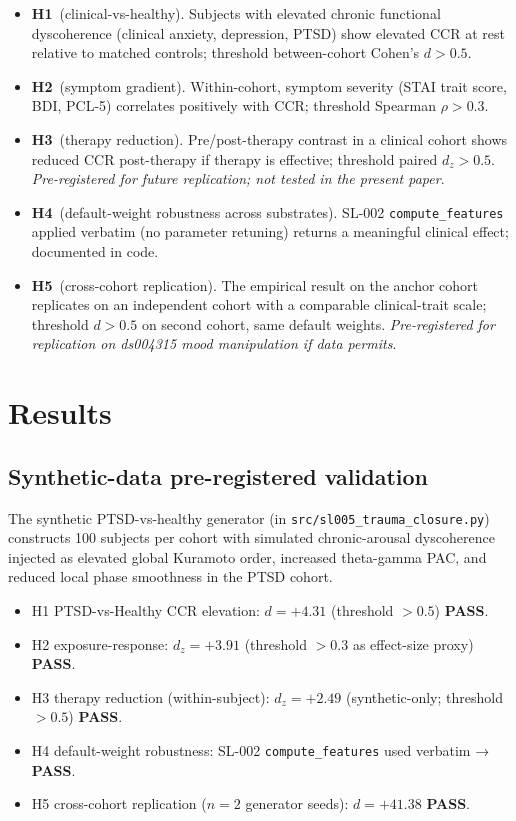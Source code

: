 \documentclass[11pt,a4paper]{article}
\begin{document}
\begin{itemize}\itemsep0pt
\item \textbf{H1}~(clinical-vs-healthy). Subjects with elevated chronic functional dyscoherence (clinical anxiety, depression, PTSD) show elevated CCR at rest relative to matched controls; threshold between-cohort Cohen's $d > 0.5$.
\item \textbf{H2}~(symptom gradient). Within-cohort, symptom severity (STAI trait score, BDI, PCL-5) correlates positively with CCR; threshold Spearman $\rho > 0.3$.
\item \textbf{H3}~(therapy reduction). Pre/post-therapy contrast in a clinical cohort shows reduced CCR post-therapy if therapy is effective; threshold paired $d_z > 0.5$. \emph{Pre-registered for future replication; not tested in the present paper}.
\item \textbf{H4}~(default-weight robustness across substrates). SL-002 \texttt{compute\_features} applied verbatim (no parameter retuning) returns a meaningful clinical effect; documented in code.
\item \textbf{H5}~(cross-cohort replication). The empirical result on the anchor cohort replicates on an independent cohort with a comparable clinical-trait scale; threshold $d > 0.5$ on second cohort, same default weights. \emph{Pre-registered for replication on ds004315 mood manipulation if data permits}.
\end{itemize}

\section{Results}\label{sec:results}

\subsection{Synthetic-data pre-registered validation}\label{sec:results-synthetic}

The synthetic PTSD-vs-healthy generator (in \texttt{src/sl005\_trauma\_closure.py}) constructs 100 subjects per cohort with simulated chronic-arousal dyscoherence injected as elevated global Kuramoto order, increased theta-gamma PAC, and reduced local phase smoothness in the PTSD cohort.

\begin{itemize}\itemsep0pt
\item H1 PTSD-vs-Healthy CCR elevation: $d = +4.31$ (threshold $> 0.5$) \textbf{PASS}.
\item H2 exposure-response: $d_z = +3.91$ (threshold $> 0.3$ as effect-size proxy) \textbf{PASS}.
\item H3 therapy reduction (within-subject): $d_z = +2.49$ (synthetic-only; threshold $> 0.5$) \textbf{PASS}.
\item H4 default-weight robustness: SL-002 \texttt{compute\_features} used verbatim → \textbf{PASS}.
\item H5 cross-cohort replication ($n=2$ generator seeds): $d = +41.38$ \textbf{PASS}.
\end{itemize}
\end{document}
